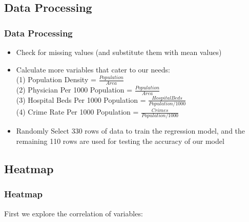 \documentclass{beamer}
\begin{document}
\subsection{Data Processing}
\begin{frame}[fragile]
\frametitle{Data Processing}
\begin{itemize}
\item Check for missing values (and substitute them with mean values)
\item Calculate more variables that cater to our needs:\\
(1) Population Density = $\frac{Population}{Area}$\\
(2) Physician Per 1000 Population = $\frac{Population}{Area}$\\
(3) Hospital Beds Per 1000 Population = $\frac{Hospital Beds}{Population/1000}$\\
(4) Crime Rate Per 1000 Population = $\frac{Crimes}{Population/1000}$
\item Randomly Select 330 rows of data to train the regression model, and the remaining 110 rows are used for testing the accuracy of our model
\end{itemize}
\end{frame}

\subsection{Heatmap}
\begin{frame}[fragile]
\frametitle{Heatmap}
First we explore the correlation of variables:
\begin{center}
\end{center}
\end{frame}
\end{document}
